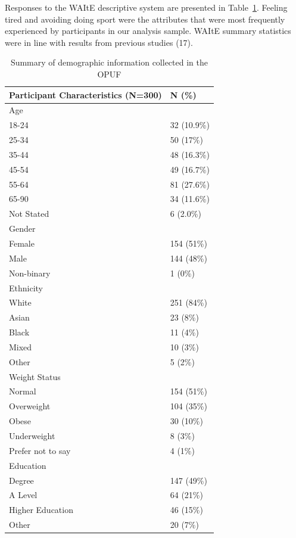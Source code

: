 \documentclass[
  letterpaper,
  DIV=11,
  numbers=noendperiod]{scrartcl}
\begin{document}
Responses to the WAItE descriptive system are presented in
Table~\ref{tbl-demographic}. Feeling tired and avoiding doing sport were
the attributes that were most frequently experienced by participants in
our analysis sample. WAItE summary statistics were in line with results
from previous studies (17).

\begin{longtable}[]{@{}ll@{}}

\caption{\label{tbl-demographic}Summary of demographic information
collected in the OPUF}

\tabularnewline

\toprule\noalign{}
Participant Characteristics (N=300) & N (\%) \\
\midrule\noalign{}
\endhead
\bottomrule\noalign{}
\endlastfoot
Age & \\
18-24 & 32 (10.9\%) \\
25-34 & 50 (17\%) \\
35-44 & 48 (16.3\%) \\
45-54 & 49 (16.7\%) \\
55-64 & 81 (27.6\%) \\
65-90 & 34 (11.6\%) \\
Not Stated & 6 (2.0\%) \\
Gender & \\
Female & 154 (51\%) \\
Male & 144 (48\%) \\
Non-binary & 1 (0\%) \\
Ethnicity & \\
White & 251 (84\%) \\
Asian & 23 (8\%) \\
Black & 11 (4\%) \\
Mixed & 10 (3\%) \\
Other & 5 (2\%) \\
Weight Status & \\
Normal & 154 (51\%) \\
Overweight & 104 (35\%) \\
Obese & 30 (10\%) \\
Underweight & 8 (3\%) \\
Prefer not to say & 4 (1\%) \\
Education & \\
Degree & 147 (49\%) \\
A Level & 64 (21\%) \\
Higher Education & 46 (15\%) \\
Other & 20 (7\%) \\

\end{longtable}
\end{document}
